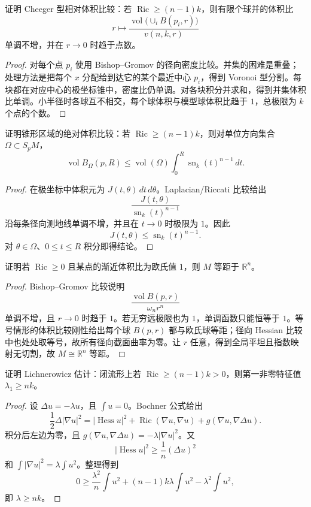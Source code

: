 \documentclass[11pt,a4paper,openany]{ctexbook}
\numberwithin{equation}{chapter}
\begin{document}
\begin{problem}
证明 Cheeger 型相对体积比较：若 \(\operatorname{Ric}\ge(n-1)k\)，则有限个球并的体积比
\[
r\mapsto \frac{\operatorname{vol}\bigl(\cup_iB(p_i,r)\bigr)}{v(n,k,r)}
\]
单调不增，并在 \(r\to0\) 时趋于点数。
\end{problem}
\begin{proof}
对每个点 \(p_i\) 使用 Bishop--Gromov 的径向密度比较。并集的困难是重叠；处理方法是把每个 \(x\) 分配给到达它的某个最近中心 \(p_i\)，得到 Voronoi 型分割。每块都在对应中心的极坐标锥中，密度比仍单调。对各块积分并求和，得到并集体积比单调。小半径时各球互不相交，每个球体积与模型球体积比趋于 \(1\)，总极限为 \(k\) 个点的个数。
\end{proof}

\begin{problem}
证明锥形区域的绝对体积比较：若 \(\operatorname{Ric}\ge(n-1)k\)，则对单位方向集合 \(\Omega\subset S_pM\)，
\[
\operatorname{vol}B_\Omega(p,R)\le \operatorname{vol}(\Omega)\int_0^R\operatorname{sn}_k(t)^{n-1}\,dt.
\]
\end{problem}
\begin{proof}
在极坐标中体积元为 \(J(t,\theta)\,dt\,d\theta\)。Laplacian/Riccati 比较给出
\[
\frac{J(t,\theta)}{\operatorname{sn}_k(t)^{n-1}}
\]
沿每条径向测地线单调不增，并且在 \(t\to0\) 时极限为 \(1\)。因此
\[
J(t,\theta)\le \operatorname{sn}_k(t)^{n-1}.
\]
对 \(\theta\in\Omega\)、\(0\le t\le R\) 积分即得结论。
\end{proof}

\begin{problem}
证明若 \(\operatorname{Ric}\ge0\) 且某点的渐近体积比为欧氏值 \(1\)，则 \(M\) 等距于 \(\mathbb R^n\)。
\end{problem}
\begin{proof}
Bishop--Gromov 比较说明
\[
\frac{\operatorname{vol}B(p,r)}{\omega_nr^n}
\]
单调不增，且 \(r\to0\) 时趋于 \(1\)。若无穷远极限也为 \(1\)，单调函数只能恒等于 \(1\)。等号情形的体积比较刚性给出每个球 \(B(p,r)\) 都与欧氏球等距；径向 Hessian 比较中也处处取等号，故所有径向截面曲率为零。让 \(r\) 任意，得到全局平坦且指数映射无切割，故 \(M\cong\mathbb R^n\) 等距。
\end{proof}

\begin{problem}
证明 Lichnerowicz 估计：闭流形上若 \(\operatorname{Ric}\ge(n-1)k>0\)，则第一非零特征值 \(\lambda_1\ge nk\)。
\end{problem}
\begin{proof}
设 \(\Delta u=-\lambda u\)，且 \(\int u=0\)。Bochner 公式给出
\[
\frac12\Delta|\nabla u|^2=|\operatorname{Hess}u|^2+\operatorname{Ric}(\nabla u,\nabla u)+g(\nabla u,\nabla\Delta u).
\]
积分后左边为零，且 \(g(\nabla u,\nabla\Delta u)=-\lambda|\nabla u|^2\)。又
\[
|\operatorname{Hess}u|^2\ge\frac1n(\Delta u)^2
\]
和 \(\int|\nabla u|^2=\lambda\int u^2\)。整理得到
\[
0\ge \frac{\lambda^2}{n}\int u^2+(n-1)k\lambda\int u^2-\lambda^2\int u^2,
\]
即 \(\lambda\ge nk\)。
\end{proof}
\end{document}
